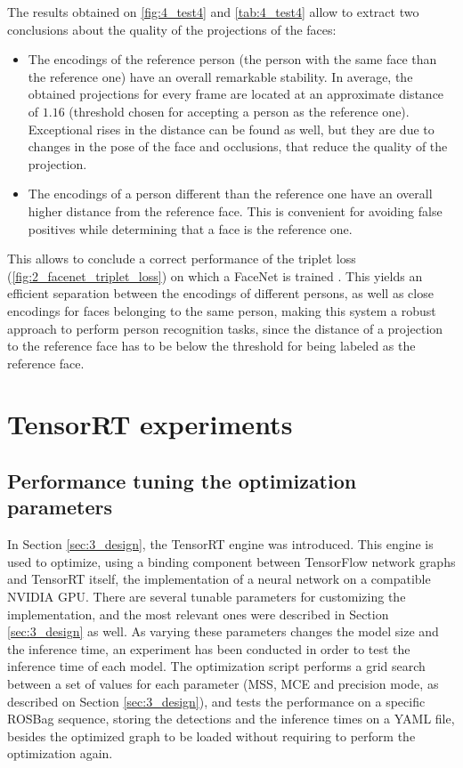 The results obtained on \autoref{fig:4_test4} and \autoref{tab:4_test4} allow to extract two conclusions about the quality of the projections of the faces:

\begin{itemize}
	\item The encodings of the reference person (the person with the same face than the reference one) have an overall remarkable stability. In average, the obtained projections for every frame are located at an approximate distance of $1.16$ (threshold chosen for accepting a person as the reference one). Exceptional rises in the distance can be found as well, but they are due to changes in the pose of the face and occlusions, that reduce the quality of the projection.\\
	\item The encodings of a person different than the reference one have an overall higher distance from the reference face. This is convenient for avoiding false positives while determining that a face is the reference one.
\end{itemize} 

This allows to conclude a correct performance of the triplet loss (\autoref{fig:2_facenet_triplet_loss}) on which a FaceNet is trained \cite{facenet}. This yields an efficient separation between the encodings of different persons, as well as close encodings for faces belonging to the same person, making this system a robust approach to perform person recognition tasks, since the distance of a projection to the reference face has to be below the threshold for being labeled as the reference face.\\



\section{TensorRT experiments}

\subsection{Performance tuning the optimization parameters}
\label{sec:4_grid_trt}

In Section \ref{sec:3_design}, the TensorRT engine was introduced. This engine is used to optimize, using a binding component between TensorFlow network graphs and TensorRT itself, the implementation of a neural network on a compatible NVIDIA GPU. There are several tunable parameters for customizing the implementation, and the most relevant ones were described in Section \ref{sec:3_design} as well. As varying these parameters changes the model size and the inference time, an experiment has been conducted in order to test the inference time of each model. The optimization script performs a grid search between a set of values for each parameter (MSS, MCE and precision mode, as described on Section \ref{sec:3_design}), and tests the performance on a specific ROSBag sequence, storing the detections and the inference times on a YAML file, besides the optimized graph to be loaded without requiring to perform the optimization again.\\

